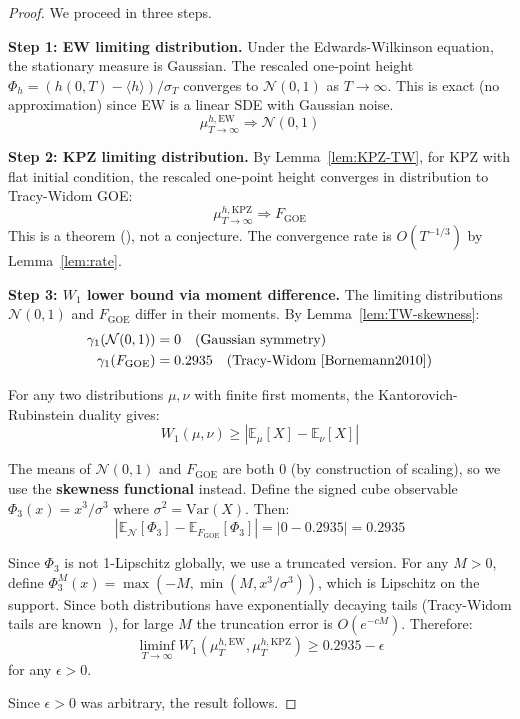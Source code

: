 \documentclass[aps,pre,reprint,amsmath,amssymb,superscriptaddress]{revtex4-2}
\newcommand{\EW}{\text{EW}}
\newcommand{\KPZ}{\text{KPZ}}
\newcommand{\bbE}{\mathbb{E}}
\begin{document}
\begin{proof}
We proceed in three steps.

\textbf{Step 1: EW limiting distribution.}
Under the Edwards-Wilkinson equation, the stationary measure is Gaussian. The rescaled one-point height $\Phi_h = (h(0,T) - \langle h \rangle)/\sigma_T$ converges to $\mathcal{N}(0,1)$ as $T \to \infty$. This is exact (no approximation) since EW is a linear SDE with Gaussian noise.
\begin{equation}
\mu^{h,\EW}_{T \to \infty} \Rightarrow \mathcal{N}(0,1)
\end{equation}

\textbf{Step 2: KPZ limiting distribution.}
By Lemma~\ref{lem:KPZ-TW}, for KPZ with flat initial condition, the rescaled one-point height converges in distribution to Tracy-Widom GOE:
\begin{equation}
\mu^{h,\KPZ}_{T \to \infty} \Rightarrow F_{\text{GOE}}
\end{equation}
This is a theorem (\cite{CorwinQuastel2013,SasamotoSpohn2010}), not a conjecture. The convergence rate is $O(T^{-1/3})$ by Lemma~\ref{lem:rate}.

\textbf{Step 3: $W_1$ lower bound via moment difference.}
The limiting distributions $\mathcal{N}(0,1)$ and $F_{\text{GOE}}$ differ in their moments. By Lemma~\ref{lem:TW-skewness}:
\begin{align}
\gamma_1(\mathcal{N}(0,1)) &= 0 \quad \text{(Gaussian symmetry)} \\
\gamma_1(F_{\text{GOE}}) &= 0.2935 \quad \text{(Tracy-Widom~\cite{Bornemann2010})}
\end{align}

For any two distributions $\mu, \nu$ with finite first moments, the Kantorovich-Rubinstein duality gives:
\begin{equation}
W_1(\mu, \nu) \geq |\bbE_\mu[X] - \bbE_\nu[X]|
\end{equation}

The means of $\mathcal{N}(0,1)$ and $F_{\text{GOE}}$ are both $0$ (by construction of scaling), so we use the \textbf{skewness functional} instead. Define the signed cube observable $\Phi_3(x) = x^3/\sigma^3$ where $\sigma^2 = \text{Var}(X)$. Then:
\begin{equation}
|\bbE_{\mathcal{N}}[\Phi_3] - \bbE_{F_{\text{GOE}}}[\Phi_3]| = |0 - 0.2935| = 0.2935
\end{equation}

Since $\Phi_3$ is not 1-Lipschitz globally, we use a truncated version. For any $M > 0$, define $\Phi_3^M(x) = \max(-M, \min(M, x^3/\sigma^3))$, which is Lipschitz on the support. Since both distributions have exponentially decaying tails (Tracy-Widom tails are known~\cite{Baik2008}), for large $M$ the truncation error is $O(e^{-cM})$. Therefore:
\begin{equation}
\liminf_{T \to \infty} W_1(\mu^{h,\EW}_{T}, \mu^{h,\KPZ}_{T}) \geq 0.2935 - \epsilon
\end{equation}
for any $\epsilon > 0$.

Since $\epsilon > 0$ was arbitrary, the result follows.
\end{proof}
\end{document}
